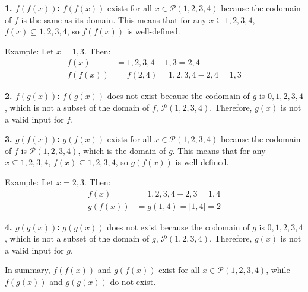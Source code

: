 \begin{solution}
	\textbf{1. $f(f(x))$:}
	$f(f(x))$ exists for all $x \in \mathcal{P}({1,2,3,4})$ because the codomain of $f$ is the same as its domain. This means that for any $x \subseteq {1,2,3,4}$, $f(x) \subseteq {1,2,3,4}$, so $f(f(x))$ is well-defined.
	
	Example:
	Let $x = {1,3}$. Then:
	\begin{align*}
		f(x) &= {1,2,3,4} - {1,3} = {2,4} \\
		f(f(x)) &= f({2,4}) = {1,2,3,4} - {2,4} = {1,3}
	\end{align*}
	
	\textbf{2. $f(g(x))$:}
	$f(g(x))$ does not exist because the codomain of $g$ is ${0,1,2,3,4}$, which is not a subset of the domain of $f$, $\mathcal{P}({1,2,3,4})$. Therefore, $g(x)$ is not a valid input for $f$.
	
	\textbf{3. $g(f(x))$:}
	$g(f(x))$ exists for all $x \in \mathcal{P}({1,2,3,4})$ because the codomain of $f$ is $\mathcal{P}({1,2,3,4})$, which is the domain of $g$. This means that for any $x \subseteq {1,2,3,4}$, $f(x) \subseteq {1,2,3,4}$, so $g(f(x))$ is well-defined.
	
	Example:
	Let $x = {2,3}$. Then:
	\begin{align*}
		f(x) &= {1,2,3,4} - {2,3} = {1,4} \\
		g(f(x)) &= g({1,4}) = |{1,4}| = 2
	\end{align*}
	
	\textbf{4. $g(g(x))$:}
	$g(g(x))$ does not exist because the codomain of $g$ is ${0,1,2,3,4}$, which is not a subset of the domain of $g$, $\mathcal{P}({1,2,3,4})$. Therefore, $g(x)$ is not a valid input for $g$.
	
	In summary, $f(f(x))$ and $g(f(x))$ exist for all $x \in \mathcal{P}({1,2,3,4})$, while $f(g(x))$ and $g(g(x))$ do not exist.
\end{solution}

